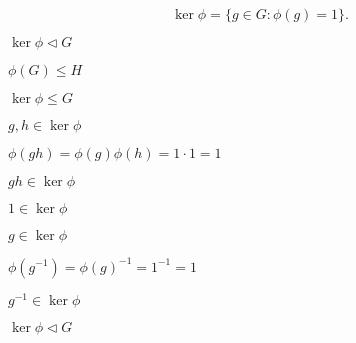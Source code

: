 \documentclass[10pt]{book}
\begin{document}
\begin{mdSnippets}
\begin{mdDisplaySnippet}
\[%
\ker \phi = \{g \in G : \phi(g) = 1\}.
\]%
\end{mdDisplaySnippet}%
\begin{mdInlineSnippet}[ce599adee134ba97d911e98b87ab2c3b]%
$\ker \phi \triangleleft G$\end{mdInlineSnippet}%
\begin{mdInlineSnippet}[0269a2b133790dd2e6695e8419915b09]%
$\phi(G) \le H$\end{mdInlineSnippet}%
\begin{mdInlineSnippet}[365789a1cce41c129e1481bf59d77f85]%
$\ker \phi \le G$\end{mdInlineSnippet}%
\begin{mdInlineSnippet}[c52a7aa3d7bcc782e72200057a406384]%
$g,h \in \ker \phi$\end{mdInlineSnippet}%
\begin{mdInlineSnippet}[6fb999d2bcd2d880c01da83a5fd5350a]%
$\phi(gh) = \phi(g)\phi(h) = 1 \cdot 1 = 1$\end{mdInlineSnippet}%
\begin{mdInlineSnippet}[488ba9c83c4c4a4185845835f1e4b7b1]%
$gh \in \ker \phi$\end{mdInlineSnippet}%
\begin{mdInlineSnippet}%
$1 \in \ker \phi$\end{mdInlineSnippet}%
\begin{mdInlineSnippet}[b9f6226368c5569d09798f790e2771af]%
$g \in \ker \phi$\end{mdInlineSnippet}%
\begin{mdInlineSnippet}[4e118401901a1d7398d4b2b2cca0b8cb]%
$\phi(g^{-1}) = \phi(g)^{-1} = 1^{-1} = 1$\end{mdInlineSnippet}%
\begin{mdInlineSnippet}[fb7d06c17de0ab3af9c38428c2547910]%
$g^{-1} \in \ker \phi$\end{mdInlineSnippet}%
\begin{mdInlineSnippet}[ce599adee134ba97d911e98b87ab2c3b]%
$\ker \phi \triangleleft G$\end{mdInlineSnippet}%
\begin{mdInlineSnippet}%

\end{mdInlineSnippet}
\end{mdSnippets}
\end{document}
